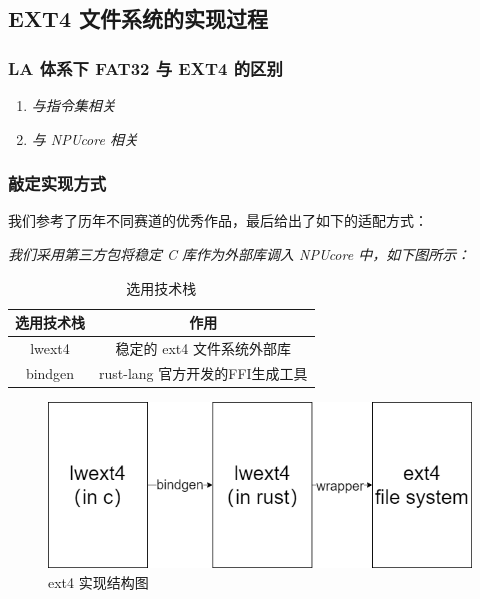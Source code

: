 
\subsection{EXT4 文件系统的实现过程}

\subsubsection{LA 体系下 FAT32 与 EXT4 的区别}

\begin{enumerate}
    \item \textit{与指令集相关}
    \item \textit{与 NPUcore 相关}
\end{enumerate}

\subsubsection{敲定实现方式}

我们参考了历年不同赛道的优秀作品，最后给出了如下的适配方式：

\textit{我们采用第三方包将稳定 C 库作为外部库调入 NPUcore 中，如下图所示：}

\begin{table}[htbp]
    \centering
    \begin{tabular}{|c|c|}
        \hline
        选用技术栈 & 作用 \\
        \hline
        lwext4 & 稳定的 ext4 文件系统外部库 \\
        bindgen & rust-lang 官方开发的FFI生成工具 \\
        \hline
    \end{tabular}
    \caption{选用技术栈}
\end{table}

\newpage

\begin{figure}[htbp]
    \centering
    \includegraphics[width=0.6\linewidth]{figs/plan-ext.png}
    \caption{ext4 实现结构图}
    \label{ext4-complexe}
\end{figure}


